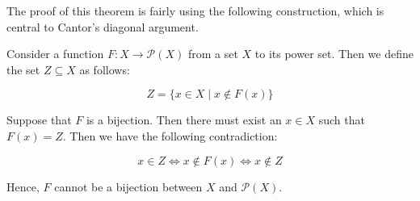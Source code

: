 \documentclass[12pt]{article}
\def\equiv{\Leftrightarrow}
\def\P{{\mathcal P}}
\def\sse{\subseteq}
\begin{document}
The proof of this theorem is fairly  using the following construction, which is central to Cantor's diagonal argument.

Consider a function $F\colon X\to \P(X)$ from a set $X$ to its power set. Then we define the set $Z\sse X$ as follows:

\[ Z = \{x\in X \mid x\not\in F(x)\}\]

Suppose that $F$ is a bijection. Then there must exist an $x\in X$ such that $F(x)=Z$. Then we have the following contradiction:

\[ x\in Z \equiv x\not\in F(x) \equiv x\not\in Z\]

Hence, $F$ cannot be a bijection between $X$ and $\P(X)$.
\end{document}
